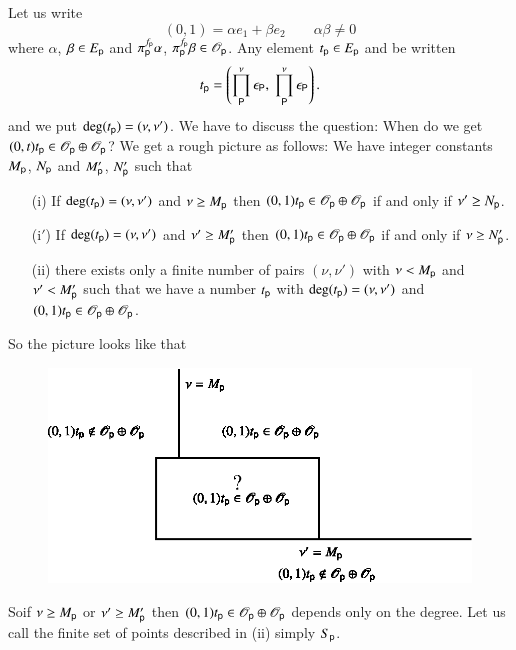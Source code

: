 Let us write
$$
(0,1)=\alpha e_{1}+\beta e_{2}\qquad \alpha\beta\neq 0
$$
where $\alpha$, $\beta\in E_{\mathsf{p}}$ and $\pi_{\mathsf{p}}^{f_{\mathsf{p}}}\alpha$, $\pi^{f_{\mathsf{p}}}_{\mathsf{p}}\beta\in \mathscr{O}_{\mathsf{p}}$. Any element $t_{\mathsf{p}}\in E_{\mathsf{p}}$ and be written
$$
t_{\mathsf{p}}=\left(\prod\limits^{\nu}_{\mathsf{P}}\epsilon_{\mathsf{P}}, \ \prod\limits^{\nu}_{\mathsf{P}}\epsilon_{\mathsf{P}}\right).
$$
and we put $\deg(t_{\mathsf{p}})=(\nu,\nu')$. We have to discuss the question: When do we get $(0,t)t_{\mathsf{p}}\in \mathscr{O}_{\mathsf{p}}\oplus \mathscr{O}_{\mathsf{p}}$? We get a rough picture as follows: We have integer constants $M_{\mathsf{p}}$, $N_{\mathsf{p}}$ and $M'_{\mathsf{p}}$, $N'_{\mathsf{p}}$ such that
\begin{itemize}
\item[(i)] If $\deg(t_{\mathsf{p}})=(\nu,\nu')$ and $\nu\geq M_{\mathsf{p}}$ then $(0,1)t_{\mathsf{p}}\in \mathscr{O}_{\mathsf{p}}\oplus \mathscr{O}_{\mathsf{p}}$ if and only if $\nu'\geq N_{\mathsf{p}}$.

\item[(i$'$)] If $\deg(t_{\mathsf{p}})=(\nu,\nu')$ and $\nu'\geq M'_{\mathsf{p}}$ then $(0,1)t_{\mathsf{p}}\in \mathscr{O}_{\mathsf{p}}\oplus \mathscr{O}_{\mathsf{p}}$ if and only if $\nu\geq N'_{\mathsf{p}}$.

\item[(ii)] there exists only a finite number of pairs $(\nu,\nu')$ with $\nu<M_{\mathsf{p}}$ and $\nu'<M'_{\mathsf{p}}$ such that we have a number $t_{\mathsf{p}}$ with $\deg(t_{\mathsf{p}})=(\nu,\nu')$ and $(0,1)t_{\mathsf{p}}\in \mathscr{O}_{\mathsf{p}}\oplus\mathscr{O}_{\mathsf{p}}$.
\end{itemize}

So the picture looks like that
\begin{figure}[H]
\centering
\includegraphics{chap2/fig1.eps}
\end{figure}
So\pageoriginale if $\nu\geq M_{\mathsf{p}}$ or $\nu'\geq M'_{\mathsf{p}}$ then $(0,1)t_{\mathsf{p}}\in \mathscr{O}_{\mathsf{p}}\oplus \mathscr{O}_{\mathsf{p}}$ depends only on the degree. Let us call the finite set of points described in (ii) simply $S_{\mathsf{p}}$.

